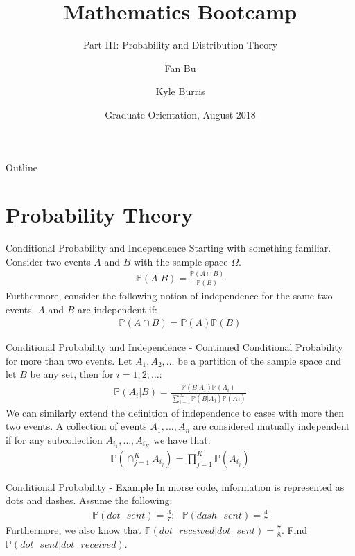 \documentclass{beamer}
\title{Mathematics Bootcamp}
\subtitle{Part III: Probability and Distribution Theory}
\author{Fan Bu\inst{1} \and Kyle Burris\inst{1}}
\institute[Duke University] %
{
  \inst{1}%
  Department of Statistical Science\\
  Duke University
  }
\date{Graduate Orientation, August 2018}
\begin{document}
\begin{frame}
  \titlepage
\end{frame}

\begin{frame}{Outline}
  \tableofcontents
\end{frame}

\section{Probability Theory}
\begin{frame}{Conditional Probability and Independence}
Starting with something familiar. Consider two events $A$ and $B$ with the sample space $\Omega$. 
\begin{align*}
\mathbb{P}(A|B) = \frac{\mathbb{P}(A \cap B)}{\mathbb{P}(B)}
\end{align*}
Furthermore, consider the following notion of independence for the same two events. $A$ and $B$ are independent if:
\begin{align*}
\mathbb{P}(A \cap B) = \mathbb{P}(A)\mathbb{P}(B)
\end{align*}
\end{frame}

\begin{frame}{Conditional Probability and Independence - Continued}
Conditional Probability for more than two events. Let $A_{1}, A_{2},\ldots$ be a partition of the sample space and let $B$ be any set, then for $i = 1, 2, \ldots$:
\begin{align*}
\mathbb{P}(A_{i}|B) = \frac{\mathbb{P}(B|A_{i})\mathbb{P}(A_{i})}{\sum_{i=1}^{\infty}\mathbb{P}(B|A_{j})\mathbb{P}(A_{j})}
\end{align*}
We can similarly extend the definition of independence to cases with more then two events. A collection of events $A_{1}, \ldots, A_{n}$ are considered mutually independent if for any subcollection $A_{i_{1}},\ldots,A_{i_{K}}$ we have that:
\begin{align*}
\mathbb{P}(\cap_{j = 1}^{K}A_{i_{j}}) = \prod_{j=1}^{K}\mathbb{P}(A_{i_{j}})
\end{align*}
\end{frame}

\begin{frame}{Conditional Probability - Example}
In morse code, information is represented as dots and dashes. Assume the following:
\begin{align*}
\mathbb{P}(dot\>\>\> sent) = \frac{3}{7} ;\>\>\>
\mathbb{P}(dash \>\>\> sent) = \frac{4}{7}
\end{align*}
Furthermore, we also know that $\mathbb{P}(dot\>\>\> received | dot \>\>\> sent) = \frac{7}{8}$. Find $\mathbb{P}(dot\>\>\> sent| dot \>\>\> received)$. 
\end{frame}
\end{document}

